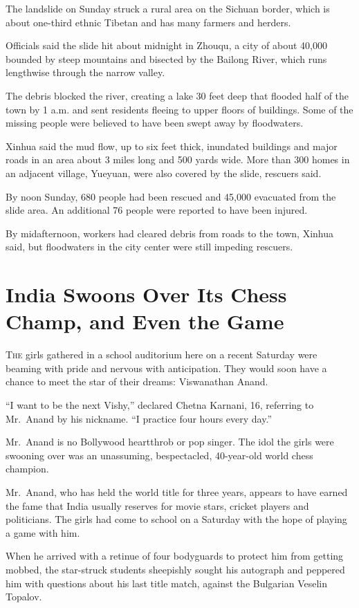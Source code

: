 ﻿\documentclass[12pt]{article}
\begin{document}
The landslide on Sunday struck a rural area on the Sichuan border, which is about one-third ethnic
Tibetan and has many farmers and herders.

Officials said the slide hit about midnight in Zhouqu, a city of about 40,000 bounded by steep
mountains and bisected by the Bailong River, which runs lengthwise through the narrow valley.

The debris blocked the river, creating a lake 30 feet deep that flooded half of the town by 1 a.m.
and sent residents fleeing to upper floors of buildings. Some of the missing people were believed to
have been swept away by floodwaters.

Xinhua said the mud flow, up to six feet thick, inundated buildings and major roads in an area about
3 miles long and 500 yards wide. More than 300 homes in an adjacent village, Yueyuan, were also
covered by the slide, rescuers said.

By noon Sunday, 680 people had been rescued and 45,000 evacuated from the slide area. An additional
76 people were reported to have been injured.

By midafternoon, workers had cleared debris from roads to the town, Xinhua said, but floodwaters in
the city center were still impeding rescuers.

\section{India Swoons Over Its Chess Champ, and Even the Game}

\lettrine{T}{he} girls gathered in a school auditorium here on a recent
Saturday were beaming with pride and nervous with anticipation. They would soon have a chance to
meet the star of their dreams: Viswanathan Anand.

``I want to be the next Vishy,'' declared Chetna Karnani, 16, referring to Mr.~Anand by his
nickname. ``I practice four hours every day.''

Mr.~Anand is no Bollywood heartthrob or pop singer. The idol the girls were swooning over was an
unassuming, bespectacled, 40-year-old world chess champion.

Mr.~Anand, who has held the world title for three years, appears to have earned the fame that India
usually reserves for movie stars, cricket players and politicians. The girls had come to school on a
Saturday with the hope of playing a game with him.

When he arrived with a retinue of four bodyguards to protect him from getting mobbed, the
star-struck students sheepishly sought his autograph and peppered him with questions about his last
title match, against the Bulgarian Veselin Topalov.
\end{document}
